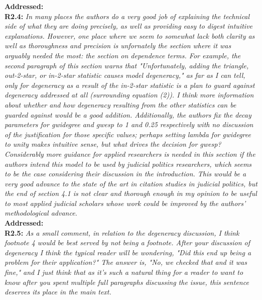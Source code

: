 \documentclass[a4paper,11pt]{texMemo}
\begin{document}
\noindent \textbf{Addressed:}  \\

\noindent \textbf{R2.4:} \emph{ In many places the authors do a very good job of explaining the technical side of what they are doing precisely, as well as providing easy to digest intuitive explanations. However, one place where we seem to somewhat lack both clarity as well as thoroughness and precision is unfornately the section where it was arguably needed the most: the section on dependence terms. For example, the second paragraph of this section warns that "Unfortunately, adding the triangle, out-2-star, or in-2-star statistic causes model degeneracy," as far as I can tell, only for degeneracy as a result of the in-2-star statistic is a plan to guard against degeneracy addressed at all (surrounding equation (2)). I think more information about whether and how degeneracy resulting from the other statistics can be guarded against would be a good addition. Additionally, the authors fix the decay parameters for gwidegree and gwesp to 1 and 0.25 respectively with no discussion of the justification for those specific values; perhaps setting lambda for gwidegree to unity makes intuitive sense, but what drives the decision for gwesp? Considerably more guidance for applied researchers is needed in this section if the authors intend this model to be used by judicial politics researchers, which seems to be the case considering their discussion in the introduction. This would be a very good advance to the state of the art in citation studies in judicial politics, but the end of section 4.1 is not clear and thorough enough in my opinion to be useful to most applied judicial scholars whose work could be improved by the authors' methodological advance.}\\

\noindent \textbf{Addressed:}  \\

\noindent \textbf{R2.5:} \emph{ As a small comment, in relation to the degeneracy discussion, I think footnote 4 would be best served by not being a footnote. After your discussion of degeneracy I think the typical reader will be wondering, "Did this end up being a problem for their application?" The answer is, "No, we checked that and it was fine," and I just think that as it's such a natural thing for a reader to want to know after you spent multiple full paragraphs discussing the issue, this sentence deserves its place in the main text.}\\
\end{document}
